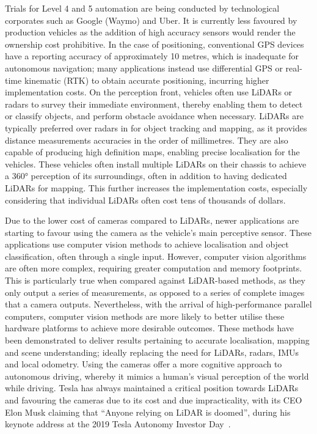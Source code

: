 Trials for Level 4 and 5 automation are being conducted by technological corporates such as Google (Waymo) and Uber. It is currently less favoured by production vehicles as the addition of high accuracy sensors would render the ownership cost prohibitive. In the case of positioning, conventional GPS devices have a reporting accuracy of approximately 10 metres, which is inadequate for autonomous navigation; many applications instead use differential GPS or real-time kinematic (RTK) to obtain accurate positioning, incurring higher implementation costs. On the perception front, vehicles often use LiDARs or radars to survey their immediate environment, thereby enabling them to detect or classify objects, and perform obstacle avoidance when necessary. LiDARs are typically preferred over radars in for object tracking and mapping, as it provides distance measurements accuracies in the order of millimetres. They are also capable of producing high definition maps, enabling precise localisation for the vehicles. These vehicles often install multiple LiDARs on their chassis to achieve a \ang{360} perception of its surroundings, often in addition to having dedicated LiDARs for mapping. This further increases the implementation costs, especially considering that individual LiDARs often cost tens of thousands of dollars. 

Due to the lower cost of cameras compared to LiDARs, newer applications are starting to favour using the camera as the vehicle's main perceptive sensor. These applications use computer vision methods to achieve localisation and object classification, often through a single input. However, computer vision algorithms are often more complex, requiring greater computation and memory footprints. This is particularly true when compared against LiDAR-based methods, as they only output a series of measurements, as opposed to a series of complete images that a camera outputs. Nevertheless, with the arrival of high-performance parallel computers, computer vision methods are more likely to better utilise these hardware platforms to achieve more desirable outcomes. These methods have been demonstrated to deliver results pertaining to accurate localisation, mapping and scene understanding; ideally replacing the need for LiDARs, radars, IMUs and local odometry. Using the cameras offer a more cognitive approach to autonomous driving, whereby it mimics a human's visual perception of the world while driving. Tesla has always maintained a critical position towards LiDARs and favouring the cameras due to its cost and due impracticality, with its CEO Elon Musk claiming that ``Anyone relying on LiDAR is doomed'', during his keynote address at the 2019 Tesla Autonomy Investor Day~\cite{burns_anyone_2019}.

